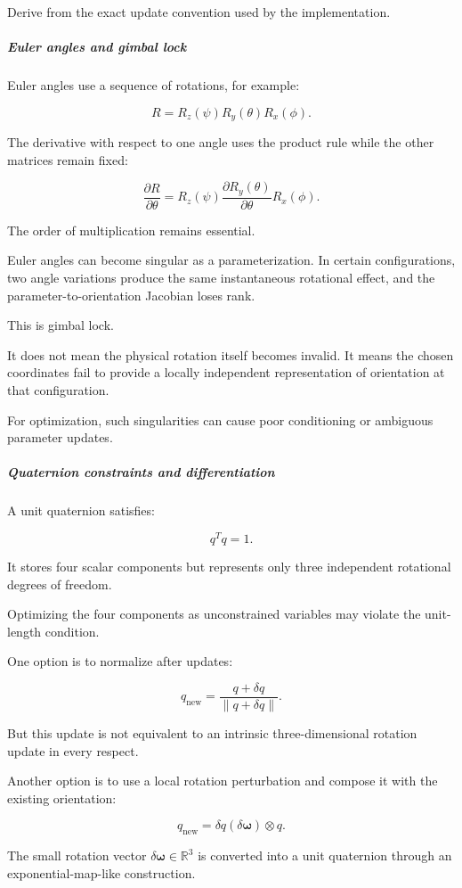 Derive from the exact update convention used by the implementation.

\subparagraph{Euler angles and gimbal lock}\label{euler-angles-and-gimbal-lock}

Euler angles use a sequence of rotations, for example:

\[
R=R_z(\psi)R_y(\theta)R_x(\phi).
\]

The derivative with respect to one angle uses the product rule while the other matrices remain fixed:

\[
\frac{\partial R}{\partial\theta} = R_z(\psi) \frac{\partial R_y(\theta)}{\partial\theta} R_x(\phi).
\]

The order of multiplication remains essential.

Euler angles can become singular as a parameterization. In certain configurations, two angle variations produce the same instantaneous rotational effect, and the parameter-to-orientation Jacobian loses rank.

This is gimbal lock.

It does not mean the physical rotation itself becomes invalid. It means the chosen coordinates fail to provide a locally independent representation of orientation at that configuration.

For optimization, such singularities can cause poor conditioning or ambiguous parameter updates.

\subparagraph{Quaternion constraints and differentiation}\label{quaternion-constraints-and-differentiation}

A unit quaternion satisfies:

\[
q^Tq=1.
\]

It stores four scalar components but represents only three independent rotational degrees of freedom.

Optimizing the four components as unconstrained variables may violate the unit-length condition.

One option is to normalize after updates:

\[
q_{\mathrm{new}}= \frac{q+\delta q}{\|q+\delta q\|}.
\]

But this update is not equivalent to an intrinsic three-dimensional rotation update in every respect.

Another option is to use a local rotation perturbation and compose it with the existing orientation:

\[
q_{\mathrm{new}}= \delta q(\delta\boldsymbol\omega)\otimes q.
\]

The small rotation vector \(\delta\boldsymbol\omega\in\mathbb R^3\) is converted into a unit quaternion through an exponential-map-like construction.

